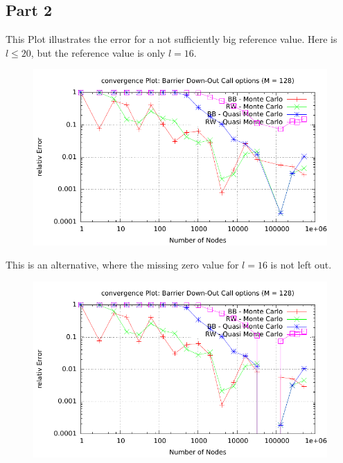 \documentclass{article}
\begin{document}
\subsection*{Part 2}
This Plot illustrates the error for a not sufficiently big reference value. Here is $ l \le 20 $, but the reference value is only $ l = 16 $.
\begin{figure}[htbp]
  \centering
     \includegraphics[width=1.0\textwidth]{../Task02/sh4_task02_2_convergencePlot.pdf}
\end{figure}
\newpage
This is an alternative, where the missing zero value for $ l = 16 $ is not left out.
\begin{figure}[htbp]
  \centering
     \includegraphics[width=1.0\textwidth]{../Task02/sh4_task02_2_alternativ.pdf}
\end{figure}
\end{document}
